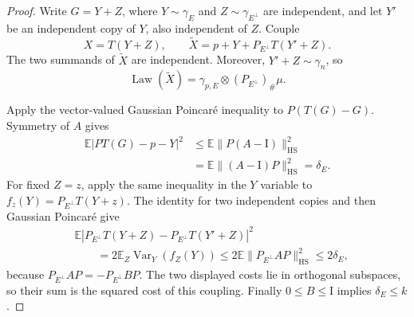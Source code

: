 \documentclass[11pt]{article}
\newcommand{\E}{\mathbb E}
\newcommand{\Var}{\operatorname{Var}}
\newcommand{\Id}{\mathrm I}
\newcommand{\HS}{\mathrm{HS}}
\newcommand{\Law}{\operatorname{Law}}
\begin{document}
\begin{proof}
Write $G=Y+Z$, where $Y\sim\gamma_E$ and $Z\sim\gamma_{E^\perp}$ are
independent, and let $Y'$ be an independent copy of $Y$, also independent of
$Z$.  Couple
\[
 X=T(Y+Z),\qquad
 \widetilde X=p+Y+P_{E^\perp}T(Y'+Z).
\]
The two summands of $\widetilde X$ are independent.  Moreover,
$Y'+Z\sim\gamma_n$, so
\[
 \Law(\widetilde X)=\gamma_{p,E}\otimes(P_{E^\perp})_\#\mu.
\]

Apply the vector-valued Gaussian Poincar\'e inequality to
$P(T(G)-G)$.  Symmetry of $A$ gives
\begin{align*}
 \E|PT(G)-p-Y|^2
 &\le \E\|P(A-\Id)\|_{\HS}^2\\
 &=\E\|(A-\Id)P\|_{\HS}^2=\delta_E.
\end{align*}
For fixed $Z=z$, apply the same inequality in the $Y$ variable to
$f_z(Y)=P_{E^\perp}T(Y+z)$.  The identity for two independent copies and then
Gaussian Poincar\'e give
\begin{align*}
 &\E|P_{E^\perp}T(Y+Z)-P_{E^\perp}T(Y'+Z)|^2\\
 &\qquad=2\E_Z\Var_Y(f_Z(Y))
 \le2\E\|P_{E^\perp}AP\|_{\HS}^2
 \le2\delta_E,
\end{align*}
because $P_{E^\perp}AP=-P_{E^\perp}BP$.  The two displayed costs lie in
orthogonal subspaces, so their sum is the squared cost of this coupling.
Finally $0\le B\le\Id$ implies $\delta_E\le k$.
\end{proof}
\end{document}
